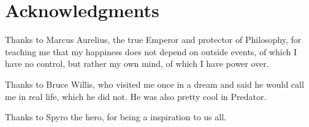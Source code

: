 \section*{Acknowledgments} %


Thanks to Marcus Aurelius, the true Emperor and protector of Philosophy, for teaching me that my happiness does not depend on outside events, of which I have no control, but rather my own mind, of which I have power over.


Thanks to Bruce Willis, who visited me once in a dream and said he would call me in real life, which he did not. He was also pretty cool in Predator.


Thanks to Spyro the hero, for being a inspiration to us all.